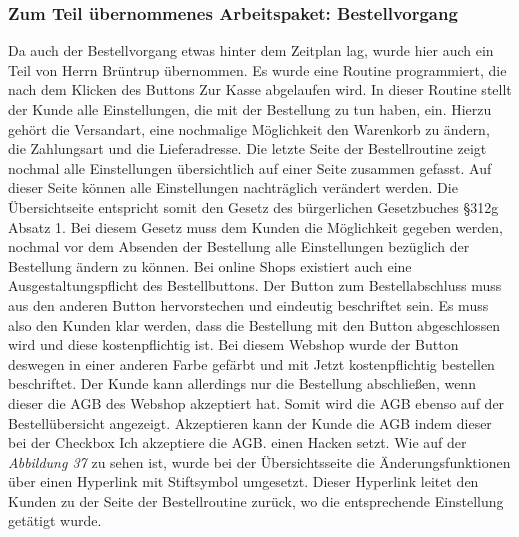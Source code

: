 \subsubsection{Zum Teil übernommenes Arbeitspaket: Bestellvorgang}
Da auch der Bestellvorgang etwas hinter dem Zeitplan lag, wurde hier auch ein Teil von Herrn Brüntrup übernommen. Es wurde eine Routine programmiert, die nach dem Klicken des Buttons \glqq Zur Kasse\grqq{} abgelaufen wird. In dieser Routine stellt der Kunde alle Einstellungen, die mit der Bestellung zu tun haben, ein. Hierzu gehört die Versandart, eine nochmalige Möglichkeit den Warenkorb zu ändern, die Zahlungsart und die Lieferadresse. Die letzte Seite der Bestellroutine zeigt nochmal alle Einstellungen übersichtlich auf einer Seite zusammen gefasst. Auf dieser Seite können alle Einstellungen nachträglich verändert werden. Die Übersichtseite entspricht somit den Gesetz des bürgerlichen Gesetzbuches §312g Absatz 1. Bei diesem Gesetz muss dem Kunden die Möglichkeit gegeben werden, nochmal vor dem Absenden der Bestellung alle Einstellungen bezüglich der Bestellung ändern zu können. Bei online Shops existiert auch eine \glqq Ausgestaltungspflicht des Bestellbuttons\grqq{}. Der Button zum Bestellabschluss muss aus den anderen Button hervorstechen und eindeutig beschriftet sein. Es muss also den Kunden klar werden, dass die Bestellung mit den Button abgeschlossen wird und diese kostenpflichtig ist. Bei diesem Webshop wurde der Button deswegen in einer anderen Farbe gefärbt und mit \glqq Jetzt kostenpflichtig bestellen\grqq{} beschriftet. Der Kunde kann allerdings nur die Bestellung abschließen, wenn dieser die AGB des Webshop akzeptiert hat. Somit wird die AGB ebenso auf der Bestellübersicht angezeigt. Akzeptieren kann der Kunde die AGB indem dieser bei der Checkbox \glqq Ich akzeptiere die AGB.\grqq{} einen Hacken setzt. Wie auf der \textit{Abbildung 37} zu sehen ist, wurde bei der Übersichtsseite die Änderungsfunktionen über einen Hyperlink mit Stiftsymbol umgesetzt. Dieser Hyperlink leitet den Kunden zu der Seite der Bestellroutine zurück, wo die entsprechende Einstellung getätigt wurde.

